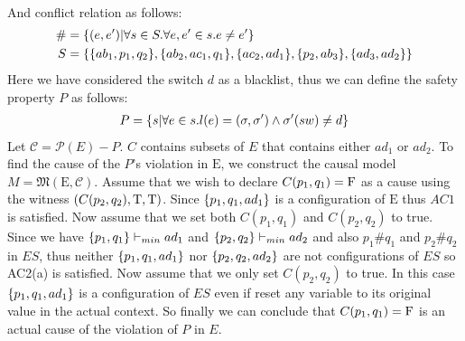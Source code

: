 \begin{example}
\begin{align*}
    \end{align*}
    And conflict relation as follows:
    \begin{align*}
        \# & = \{(e,e')| \forall s \in S. \forall e,e'\in s .e \neq e'\} \\
        S & = \{
            \{ab_1,p_1,q_2\},\{ab_2,ac_1,q_1\},\{ac_2,ad_1\},
            \{p_2,ab_3\},\{ad_3,ad_2\}
        \}
    \end{align*}
    Here we have considered the switch $d$ as a blacklist, thus we can define the
    safety property $P$ as follows:
    \begin{align*}
        P = \{s|\forall e \in s. l(e) = (\sigma,\sigma')\wedge \sigma'(sw) \neq d\}
    \end{align*}
    Let $\mathcal{C} = \mathcal{P}(E) - P$.
    $C$ contains subsets of $E$ that contains either $ad_1$ or $ad_2$.
    To find the cause of the $P$'s violation in $\mathrm{E}$, we construct the
    causal model $M = \mathfrak{M}(\mathrm{E},\mathcal{C})$.
    Assume that we wish to declare $C(p_1,q_1) = \mathrm{F}$ as a cause using the witness
    $(C(p_2,q_2),\mathrm{T},\mathrm{T})$.
    Since $\{p_1,q_1,ad_1\}$ is a configuration of $\mathrm{E}$ thus
    $AC1$ is satisfied.
    Now assume that we set both $C(p_1,q_1)$ and $C(p_2,q_2)$ to true.
    Since we have $\{p_1,q_1\} \vdash_{min} ad_1$ and
    $\{p_2,q_2\} \vdash_{min} ad_2$ and also $p_1\#q_1$ and $p_2\#q_2$ in $ES$,
    thus neither $\{p_1,q_1,ad_1\}$ nor $\{p_2,q_2,ad_2\}$ are not
    configurations of $ES$ so AC2(a) is satisfied.
    Now assume that we only set $C(p_2,q_2)$ to true.
    In this case $\{p_1,q_1,ad_1\}$ is a configuration of $ES$ even if reset any
    variable to its original value in the actual context.
    So finally we can conclude that $C(p_1,q_1) = \mathrm{F}$ is an actual cause of the
    violation of $P$ in $E$.
\end{example}
